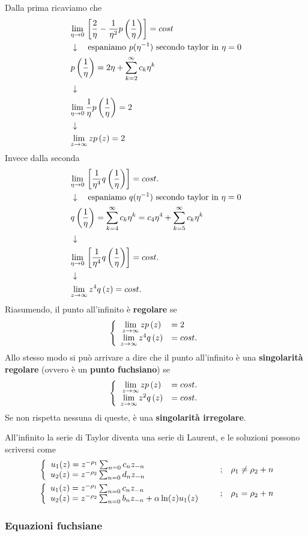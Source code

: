 Dalla prima ricaviamo che
\begin{align}
	&\underset{\eta \rightarrow 0}{\lim} \,\left[\frac{2}{\eta} -\frac{1}{\eta^2}p\left(\frac{1}{\eta}\right)\right] = cost \\ &\downarrow \quad \text{espaniamo $p(\eta^{-1})$ secondo taylor in $\eta = 0$} \nonumber \\
	&p\left(\frac{1}{\eta}\right) = 2\eta + \sum_{k=2}^{\infty} c_k \eta^k \nonumber \\ &\downarrow \nonumber \\
	&\underset{\eta \rightarrow 0}{\lim} \,\frac{1}{\eta}p\left(\frac{1}{\eta}\right) = 2 \nonumber \\ &\downarrow \nonumber \\
	&\underset{z \rightarrow \infty}{\lim} \,zp\left(z\right) = 2	
\end{align}
Invece dalla seconda
\begin{align}
	&\underset{\eta \rightarrow 0}{\lim} \, \left[\frac{1}{\eta^4} q\left(\frac{1}{\eta}\right)\right] = cost.\\ &\downarrow \quad \text{espaniamo $q(\eta^{-1})$ secondo taylor in $\eta = 0$} \nonumber \\
	&q \left(\frac{1}{\eta}\right) = \sum_{k=4}^{\infty} c_k \eta^k = c_4 \eta^4 +  \sum_{k=5}^{\infty} c_k \eta^k \nonumber \\ &\downarrow \nonumber \\
	&\underset{\eta \rightarrow 0}{\lim} \, \left[\frac{1}{\eta^4} q\left(\frac{1}{\eta}\right)\right] = cost. \nonumber \\ &\downarrow \nonumber \\
	&\underset{z \rightarrow \infty}{\lim} \, z^4 q\left(z\right) = cost.
\end{align}
Riasumendo, il punto all'infinito è \textbf{regolare} se
\begin{align}
	\double{\limit{z}{\infty}zp\left(z\right) &= 2\hfill}{\limit{z}{\infty} z^4 q\left(z\right) &= cost.}
\end{align}
Allo stesso modo si può arrivare a dire che il punto all'infinito è una \textbf{singolarità regolare} (ovvero è un \textbf{punto fuchsiano}) se
\begin{align}
	\double{\limit{z}{\infty}zp\left(z\right) &= cost. \hfill}{\limit{z}{\infty} z^2 q\left(z\right) &= cost.}
\end{align}
Se non rispetta nessuna di queste, è una \textbf{singolarità irregolare}.

All'infinito la serie di Taylor diventa una serie di Laurent, e le soluzioni possono scriversi come
\begin{align}
	&\double{u_1(z) = z^{-\rho_1} \sum_{n=0} c_n z_{-n}}{u_2(z) = z^{-\rho_2} \sum_{n=0} d_n z_{-n}} &\spacer &\rho_1 \neq \rho_2 + n\\
	&\double{u_1(z) = z^{-\rho_1} \sum_{n=0} c_n z_{-n}\hfill}{u_2(z) = z^{-\rho_2} \sum_{n=0} b_n z_{-n} + \alpha\ln(z) u_1(z) } &\spacer &\rho_1 = \rho_2 + n
\end{align}

\newpage

\subsubsection{Equazioni fuchsiane}

